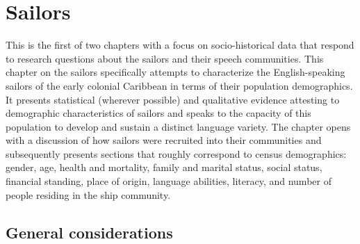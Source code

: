 \chapter{ {Sailors} }

This is the first of two chapters with a focus on socio-historical data that respond to research questions about the sailors and their speech communities. This chapter on the sailors specifically attempts to characterize the English-speaking sailors of the early colonial Caribbean in terms of their population demographics. It presents statistical (wherever possible) and qualitative evidence attesting to demographic characteristics of sailors and speaks to the capacity of this population to develop and sustain a distinct language variety. The chapter opens with a discussion of how sailors were recruited into their communities and subsequently presents sections that roughly correspond to census demographics: gender, age, health and mortality, family and marital status, social status, financial standing, place of origin, language abilities, literacy, and number of people residing in the ship community. 

\section{{General} {considerations}}%

